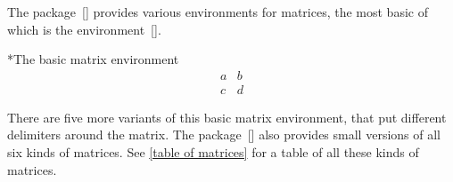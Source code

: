 The package~[\packname] provides various environments for matrices, the most basic of which is the environment~[\envname].
\begin{showlatex}*{The basic matrix environment~}
\[
  \begin{matrix}
    a & b \\
    c & d
  \end{matrix}
\]
\end{showlatex}
There are five more variants of this basic matrix environment, that put different delimiters around the matrix.
The package~[\packname] also provides small versions of all six kinds of matrices.
See \cref{table of matrices} for a table of all these kinds of matrices.

